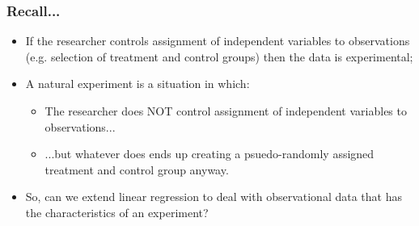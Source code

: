 \documentclass[aspectratio=169]{beamer}
\theoremstyle{principle}
\begin{document}
\begin{frame}
\frametitle{Recall...}

\begin{itemize}
\item If the researcher controls assignment of independent variables to observations (e.g. selection of treatment and control groups) then the data is experimental;
\bigskip
\bigskip

\item A natural experiment is a situation in which:
\begin{itemize}
\item The researcher does NOT control assignment of independent variables to observations...
\item ...but whatever does ends up creating a psuedo-randomly assigned treatment and control group anyway.
 \end{itemize}
\bigskip
\bigskip

\item So, can we extend linear regression to deal with observational data that has the characteristics of an experiment?
\end{itemize}

\end{frame}
\end{document}
